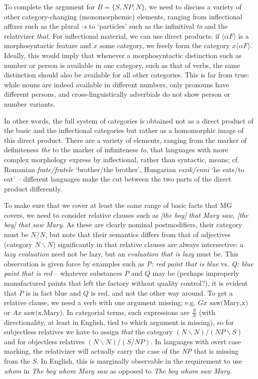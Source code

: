 To complete the argument for $B = \{S, \textit{NP}, N\}$, we need to discuss a
variety of other category-changing (monomorphemic) elements, ranging from
inflectional affixes such as the plural {\it -s} to `particles' such as the
infinitival {\it to} and the relativizer {\it that}. For inflectional
material, we can use direct products: if $\langle \alpha F \rangle$ is a
morphosyntactic feature and $x$ some category, we freely form the category $x
\langle \alpha F \rangle$.  Ideally, this would imply that whenever a
morphosyntactic distinction such as number or person is available in one
category, such as that of verbs, the same distinction should also be available
for all other categories. This is far from true: while nouns are indeed
available in different numbers, only pronouns have different persons, and
cross-linguistically adverbials do not show person or number variants.

In other words, the full system of categories is obtained not as a direct
product of the basic and the inflectional categories but rather as a
homomorphic image of this direct product.  There are a variety of elements,
ranging from the marker of definiteness {\it the} to the marker of
infiniteness {\it to}, that languages with more complex morphology express by
inflectional, rather than syntactic, means; cf. Romanian {\it frate/fratele}
`brother/the brother', Hungarian {\it eszik/enni} `he eats/to eat' --
 different languages make the cut between the
two parts of the direct product differently.

To make sure that we cover at least the same range of basic facts that MG
covers, we need to consider relative clauses such as {\it [the boy] that Mary
  saw, [the boy] that saw Mary}. As these are clearly nominal postmodifiers,
their category must be $N/N$, but note that their semantics differs from that
of adjectives (category $N\backslash N$) significantly in that relative
clauses are always intersective: a {\it lazy evaluation} need not be lazy, but
an {\it evaluation that is lazy} must be. This observation is given force by
examples such as {\it P: red paint that is blue} vs. {\it Q: blue paint that
  is red} -- whatever substances $P$ and $Q$ may be (perhaps improperly
manufactured paints that left the factory without quality control?), it is
evident that $P$ is in fact blue and $Q$ is red, and not the other way
around. To get a relative clause, we need a verb with one argument missing;
e.g. $G x \text{ saw(Mary,x)}$ or $A x \text{ saw(x,Mary)}$. In categorial
terms, such expressions are $\frac{S}{N}$ (with directionality, at least in
English, tied to which argument is missing), so for subjectless relatives we
have to assign {\it that} the category $(N\backslash N)/(\textit{NP}\backslash
S)$ and for objectless relatives $(N\backslash N)/(S/\textit{NP})$. In
languages with overt case marking, the relativizer will actually carry the
case of the {\it NP} that is missing from the $S$. In English, this is
marginally observable in the requirement to use {\it whom} in {\it The boy
  whom Mary saw} as opposed to {\it *The boy whom saw Mary.}

